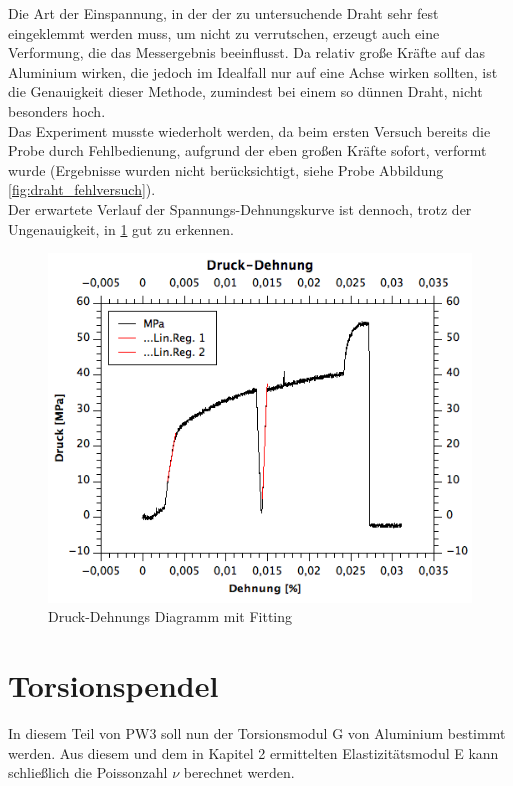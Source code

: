 \documentclass[12pt,a4paper]{article}
\begin{document}
\begin{multicols}{2}
Die Art der Einspannung, in der der zu untersuchende Draht sehr fest eingeklemmt werden muss, um nicht zu verrutschen, erzeugt auch eine Verformung, die das Messergebnis beeinflusst. Da relativ große Kräfte auf das Aluminium wirken, die jedoch im Idealfall nur auf eine Achse wirken sollten, ist die Genauigkeit dieser Methode, zumindest bei einem so dünnen Draht, nicht besonders hoch.\\
Das Experiment musste wiederholt werden, da beim ersten Versuch bereits die Probe durch Fehlbedienung, aufgrund der eben großen Kräfte sofort, verformt wurde (Ergebnisse wurden nicht berücksichtigt, siehe Probe Abbildung \ref{fig:draht_fehlversuch}).\\
Der erwartete Verlauf der Spannungs-Dehnungskurve ist dennoch, trotz der Ungenauigkeit, in \ref{fig:draht_druck_dehnung_linreg} gut zu erkennen.

\begin{figure}[H]
	\centering
  	\includegraphics[scale=0.4]{./figure/druck_dehnung_linreg.png}
	\caption{Druck-Dehnungs Diagramm mit Fitting}
	\label{fig:draht_druck_dehnung_linreg}
\end{figure}

\section{Torsionspendel}
In diesem Teil von PW3 soll nun der Torsionsmodul G von Aluminium bestimmt werden. Aus diesem und dem in Kapitel 2 ermittelten Elastizitätsmodul E kann schließlich die Poissonzahl $\nu $ berechnet werden.\\


\end{multicols}
\end{document}
